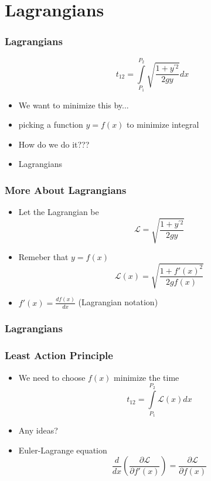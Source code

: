\documentclass[12pt]{beamer}
\begin{document}
\section{Lagrangians}
\begin{frame}
\frametitle{Lagrangians}
    $$
    t_{12} = \int \limits_{P_1}^{P_2} \sqrt{\frac{1 + y^{'2}}{2gy}} dx
    $$
\pause
\begin{itemize}
    \item We want to minimize this by...
    \pause
    \item picking a function $y = f(x)$ to minimize integral
    \pause
    \item How do we do it???
    \pause
    \item Lagrangians
\end{itemize}
\end{frame}

\begin{frame}
\frametitle{More About Lagrangians}
\begin{itemize}
    \item Let the Lagrangian be
    $$
    \mathcal{L} = \sqrt{\frac{1 + y^{'2}}{2gy}}
    $$
    \pause
    \item Remeber that $y = f(x)$
    $$
    \mathcal{L}(x) = \sqrt{\frac{1 + f'(x)^2}{2gf(x)}}
    $$
    \item $f'(x) = \frac{df(x)}{dx}$ (Lagrangian notation)
\end{itemize}
\end{frame}

\begin{frame}
\frametitle{Lagrangians}
\frametitle{Least Action Principle}
\begin{itemize}
    \item We need to choose $f(x)$ minimize the time 
    $$
    t_{12} = \int \limits_{P_1}^{P_2} \mathcal{L}(x) dx
    $$
    \pause
    \item Any ideas?
    \pause
    \item Euler-Lagrange equation
    $$
    \frac{d}{dx} \left ( \frac{\partial \mathcal{L} }{\partial f'(x) } \right ) = \frac{\partial \mathcal{L}}{\partial f(x)}
    $$
\end{itemize}
\end{frame}
\end{document}
